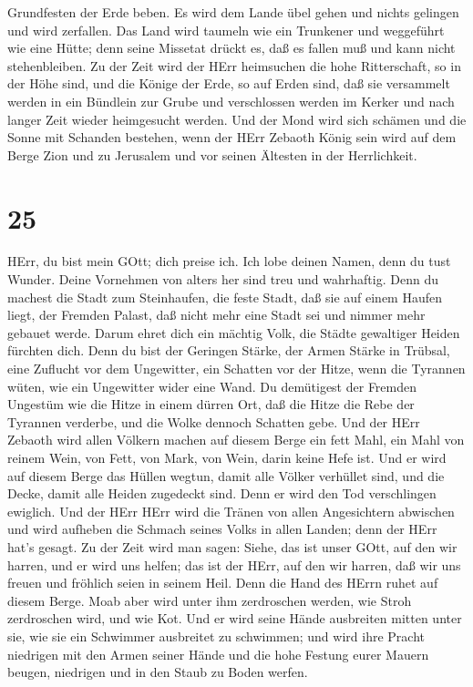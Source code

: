 Grundfesten der Erde beben.  Es wird dem Lande übel gehen
und nichts gelingen und wird zerfallen.  Das Land wird
taumeln wie ein Trunkener und weggeführt wie eine Hütte; denn seine
Missetat drückt es, daß es fallen muß und kann nicht stehenbleiben.
 Zu der Zeit wird der HErr heimsuchen die hohe
Ritterschaft, so in der Höhe sind, und die Könige der Erde, so auf Erden
sind,  daß sie versammelt werden in ein Bündlein zur Grube
und verschlossen werden im Kerker und nach langer Zeit wieder
heimgesucht werden.  Und der Mond wird sich schämen und die
Sonne mit Schanden bestehen, wenn der HErr Zebaoth König sein wird auf
dem Berge Zion und zu Jerusalem und vor seinen Ältesten in der
Herrlichkeit.

\hypertarget{section-24}{%
\section{25}\label{section-24}}

 HErr, du bist mein GOtt; dich preise ich. Ich lobe deinen
Namen, denn du tust Wunder. Deine Vornehmen von alters her sind treu und
wahrhaftig.  Denn du machest die Stadt zum Steinhaufen, die
feste Stadt, daß sie auf einem Haufen liegt, der Fremden Palast, daß
nicht mehr eine Stadt sei und nimmer mehr gebauet werde. 
Darum ehret dich ein mächtig Volk, die Städte gewaltiger Heiden fürchten
dich.  Denn du bist der Geringen Stärke, der Armen Stärke in
Trübsal, eine Zuflucht vor dem Ungewitter, ein Schatten vor der Hitze,
wenn die Tyrannen wüten, wie ein Ungewitter wider eine Wand.
 Du demütigest der Fremden Ungestüm wie die Hitze in einem
dürren Ort, daß die Hitze die Rebe der Tyrannen verderbe, und die Wolke
dennoch Schatten gebe.  Und der HErr Zebaoth wird allen
Völkern machen auf diesem Berge ein fett Mahl, ein Mahl von reinem Wein,
von Fett, von Mark, von Wein, darin keine Hefe ist.  Und er
wird auf diesem Berge das Hüllen wegtun, damit alle Völker verhüllet
sind, und die Decke, damit alle Heiden zugedeckt sind.  Denn
er wird den Tod verschlingen ewiglich. Und der HErr HErr wird die Tränen
von allen Angesichtern abwischen und wird aufheben die Schmach seines
Volks in allen Landen; denn der HErr hat's gesagt.  Zu der
Zeit wird man sagen: Siehe, das ist unser GOtt, auf den wir harren, und
er wird uns helfen; das ist der HErr, auf den wir harren, daß wir uns
freuen und fröhlich seien in seinem Heil.  Denn die Hand
des HErrn ruhet auf diesem Berge. Moab aber wird unter ihm zerdroschen
werden, wie Stroh zerdroschen wird, und wie Kot.  Und er
wird seine Hände ausbreiten mitten unter sie, wie sie ein Schwimmer
ausbreitet zu schwimmen; und wird ihre Pracht niedrigen mit den Armen
seiner Hände  und die hohe Festung eurer Mauern beugen,
niedrigen und in den Staub zu Boden werfen.

